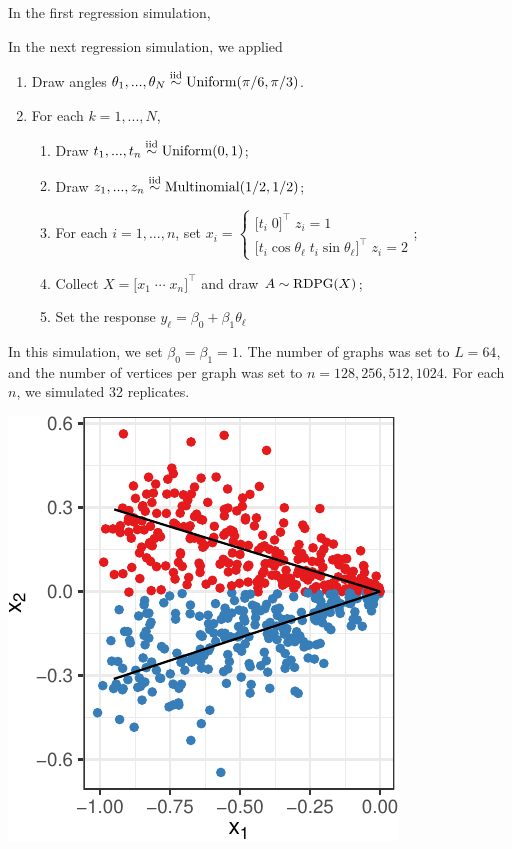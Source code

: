 \documentclass[12pt]{article}
\providecommand{\tightlist}{%
  \setlength{\itemsep}{0pt}\setlength{\parskip}{0pt}}
\begin{document}
In the first regression simulation,

In the next regression simulation, we applied

\begin{enumerate}
\def\labelenumi{\arabic{enumi}.}
\tightlist
\item
  Draw angles
  \(\theta_1, ..., \theta_N \stackrel{\mathrm{iid}}{\sim} \mathrm{Uniform}(\pi / 6, \pi / 3)\).
\item
  For each \(k = 1, ..., N\),

  \begin{enumerate}
  \def\labelenumii{\roman{enumii}.}
  \tightlist
  \item
    Draw \(t_1, ..., t_n \stackrel{\mathrm{iid}}{\sim} \mathrm{Uniform}(0, 1)\);
  \item
    Draw \(z_1, ..., z_n \stackrel{\mathrm{iid}}{\sim} \mathrm{Multinomial}(1/2, 1/2)\);
  \item
    For each \(i = 1, ..., n\), set
    \(x_i = \begin{cases} \bigl[ t_i \; 0 \bigr]^\top \; z_i = 1 \\ \bigl[ t_i \cos \theta_\ell \; t_i \sin \theta_\ell \bigr]^\top \; z_i = 2 \end{cases}\);
  \item
    Collect \(X = \bigl[ x_1 \; \cdots \; x_n \bigr]^\top\) and draw
    \(A \sim \mathrm{RDPG}(X)\);
  \item
    Set the response \(y_\ell = \beta_0 + \beta_1 \theta_\ell\)
  \end{enumerate}
\end{enumerate}

In this simulation, we set \(\beta_0 = \beta_1 = 1\). The number of
graphs was set to \(L = 64\), and the number of vertices per graph was
set to \(n = 128, 256, 512, 1024\). For each \(n\), we simulated 32
replicates.

\begin{center}\includegraphics{draft_files/figure-latex/angle-reg-example-1} \end{center}
\end{document}
